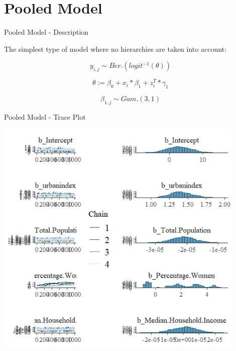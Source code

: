 \documentclass{beamer}
\begin{document}
\section{Pooled Model}

\begin{frame}{Pooled Model - Description}

The simplest type of model where no hierarchies are taken into account:

\[y_{i, j} \sim Ber.(logit^{-1}(\theta))\]

\[\theta := \beta_0 + x_{i} * \beta_{1}  + z_{i}^T * \gamma_{1}\]

\[\beta_{1,j} \sim Gam.(3, 1)\]

\end{frame}

\begin{frame}{Pooled Model - Trace Plot}

\includegraphics[width=0.9\textwidth]{plots/chains_pooled_model_default_priors_1.jpeg}

\end{frame}
\end{document}
